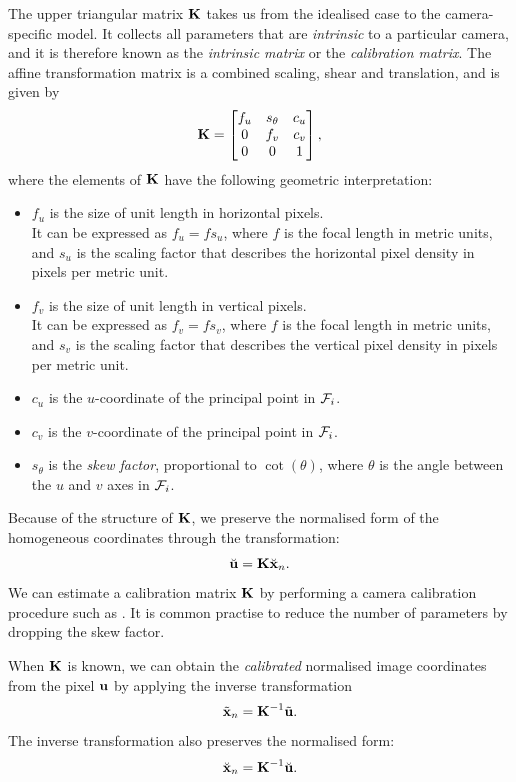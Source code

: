 The upper triangular matrix ${\boldsymbol{\mathbf{K}}}$ takes us from the idealised case to the camera-specific model.
It collects all parameters that are \emph{intrinsic} to a particular camera, and it is therefore known as the \emph{intrinsic matrix} or the \emph{calibration matrix}.
The affine transformation matrix is a combined scaling, shear and translation, and is given by
\begin{equation}
  {\boldsymbol{\mathbf{K}}} = 
  \begin{bmatrix}
    f_u & s_\theta & c_u\\
    0 & f_v & c_v\\
    0 & 0 & 1
  \end{bmatrix},
\end{equation}
where the elements of ${\boldsymbol{\mathbf{K}}}$ have the following geometric interpretation:
\begin{itemize}
  \item $f_u$ is the size of unit length in horizontal pixels.\\
  It can be expressed as $f_u = f s_u$, where $f$ is the focal length in metric units, and $s_u$ is the scaling factor that describes the horizontal pixel density in pixels per metric unit.
  \item $f_v$ is the size of unit length in vertical pixels.\\
  It can be expressed as $f_v = f s_v$, where $f$ is the focal length in metric units, and $s_v$ is the scaling factor that describes the vertical pixel density in pixels per metric unit.
  \item $c_u$ is the $u$-coordinate of the principal point in $\mathcal{F}_i$.
  \item $c_v$ is the $v$-coordinate of the principal point in $\mathcal{F}_i$.
  \item $s_\theta$ is the \emph{skew factor}, proportional to $\cot(\theta)$, where $\theta$ is the angle between the $u$ and $v$ axes in $\mathcal{F}_i$.
\end{itemize}
Because of the structure of ${\boldsymbol{\mathbf{K}}}$, we preserve the normalised form of the homogeneous coordinates through the transformation:
\begin{equation}
  \breve{{\boldsymbol{\mathbf{u}}}} = {\boldsymbol{\mathbf{K}}} \breve{{\boldsymbol{\mathbf{x}}}}_n.
\end{equation}
We can estimate a calibration matrix ${\boldsymbol{\mathbf{K}}}$ by performing a camera calibration procedure such as \cite{Zhang2000ACalibration}.
It is common practise to reduce the number of parameters by dropping the skew factor.

When ${\boldsymbol{\mathbf{K}}}$ is known, we can obtain the \emph{calibrated} normalised image coordinates from the pixel ${\boldsymbol{\mathbf{u}}}$ by applying the inverse transformation
\begin{equation}
  \tilde{{\boldsymbol{\mathbf{x}}}}_n = {\boldsymbol{\mathbf{K}}}^{-1} \tilde{{\boldsymbol{\mathbf{u}}}}.
\end{equation}
The inverse transformation also preserves the normalised form:
\begin{equation} \label{eq:normalised-from-pixel}
  \breve{{\boldsymbol{\mathbf{x}}}}_n = {\boldsymbol{\mathbf{K}}}^{-1} \breve{{\boldsymbol{\mathbf{u}}}}.
\end{equation}

